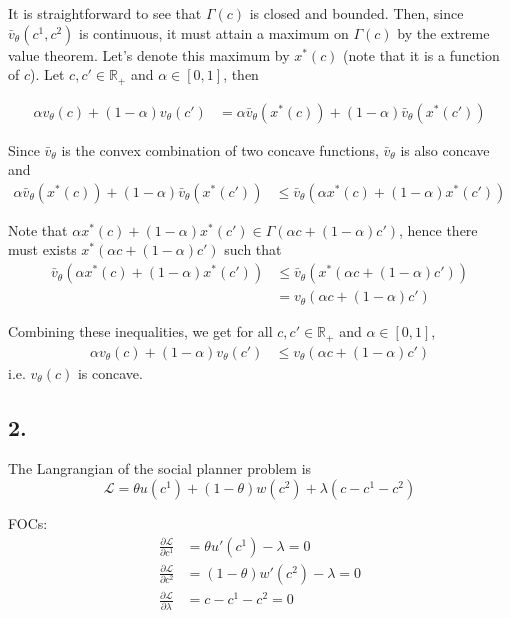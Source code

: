 \documentclass[12pt]{article}
\theoremstyle{definition}
\newcommand\R{\mathbb{R}}
\begin{document}
It is straightforward to see that $\Gamma(c)$ is closed and bounded. Then, since $\bar{v}_{\theta}(c^1,c^2)$ is continuous, it must attain a maximum on $\Gamma(c)$ by the extreme value theorem. Let's denote this maximum by $x^*(c)$ (note that it is a function of $c$). Let $c,c'\in \R_+$ and $\alpha \in [0,1]$, then

\begin{align*}
	\alpha v_{\theta}(c) + (1-\alpha ) v_{\theta}(c') & = \alpha \bar{v}_{\theta}(x^*(c)) + (1-\alpha ) \bar{v}_{\theta}(x^*(c'))
\end{align*}

Since $\bar{v}_{\theta}$ is the convex combination of two concave functions, $\bar{v}_{\theta}$ is also concave and
\begin{align*}
\alpha \bar{v}_{\theta}(x^*(c)) + (1-\alpha ) \bar{v}_{\theta}(x^*(c')) & \leq  \bar{v}_{\theta}(\alpha x^*(c) + (1-\alpha) x^*(c')) 
\end{align*}

Note that $\alpha x^*(c) + (1-\alpha) x^*(c') \in \Gamma(\alpha c + (1-\alpha)c')$, hence there must exists $x^*(\alpha c + (1-\alpha)c')$ such that
\begin{align*}
\bar{v}_{\theta}(\alpha x^*(c) + (1-\alpha) x^*(c')) & \leq  \bar{v}_{\theta}(x^*(\alpha c + (1-\alpha)c'))\\
& =v_{\theta}(\alpha c + (1-\alpha) c')
\end{align*}

Combining these inequalities, we get for all  $c,c'\in \R_+$ and $\alpha \in [0,1]$,
\begin{align*}
\alpha v_{\theta}(c) + (1-\alpha ) v_{\theta}(c')& \leq  v_{\theta}(\alpha c + (1-\alpha) c')
\end{align*}
i.e. $v_{\theta}(c)$ is concave.
\subsection*{2.}

The Langrangian of the social planner problem is
\[
\mathcal{L} = \theta u(c^1)+(1-\theta)w(c^2) +\lambda ( c-c^1-c^2)
\]

FOCs:
\begin{align*}
	\frac{\partial \mathcal{L}}{\partial c^1} &= \theta u'(c^1) - \lambda =0\\
	\frac{\partial \mathcal{L}}{\partial c^2} &= (1-\theta) w'(c^2) - \lambda =0\\
	\frac{\partial \mathcal{L}}{\partial \lambda} &=  c-c^1-c^2  =0
\end{align*}
\end{document}
